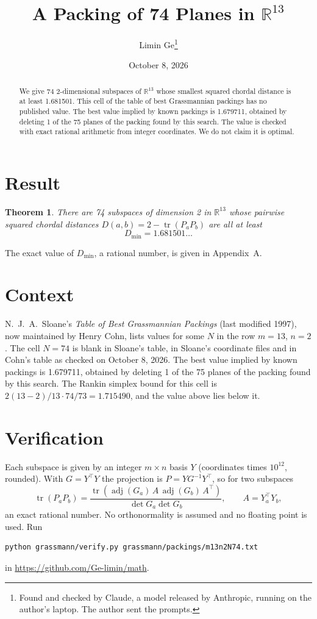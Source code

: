 \documentclass[11pt,a4paper]{article}
\title{A Packing of 74 Planes in $\mathbb{R}^{13}$}
\author{Limin Ge\thanks{Found and checked by Claude, a model released by Anthropic, running on the author's laptop. The author sent the prompts.}}
\date{October 8, 2026}
\newtheorem*{theorem}{Theorem}
\begin{document}
\maketitle
\begin{abstract}
We give 74 2-dimensional subspaces of $\mathbb{R}^{13}$ whose smallest squared chordal distance is at least 1.681501. This cell of the table of best Grassmannian packings has no published value. The best value implied by known packings is 1.679711, obtained by deleting 1 of the 75 planes of the packing found by this search. The value is checked with exact rational arithmetic from integer coordinates. We do not claim it is optimal.
\end{abstract}

\section{Result}
\begin{theorem}
There are 74 subspaces of dimension 2 in $\mathbb{R}^{13}$ whose pairwise squared chordal distances $D(a,b) = 2 - \operatorname{tr}(P_aP_b)$ are all at least
\[ D_{\min} = 1.681501\ldots \]
\end{theorem}
The exact value of $D_{\min}$, a rational number, is given in Appendix~A.


\section{Context}
N.~J.~A.~Sloane's \emph{Table of Best Grassmannian Packings} (last modified 1997), now maintained by Henry Cohn, lists values for some $N$ in the row $m=13$, $n=2$. The cell $N=74$ is blank in Sloane's table, in Sloane's coordinate files and in Cohn's table as checked on October 8, 2026. The best value implied by known packings is 1.679711, obtained by deleting 1 of the 75 planes of the packing found by this search. The Rankin simplex bound for this cell is $2(13-2)/13\cdot 74/73 = 1.715490$, and the value above lies below it.


\section{Verification}
Each subspace is given by an integer $m\times n$ basis $Y$ (coordinates times $10^{12}$, rounded). With $G=Y^\top Y$ the projection is $P=YG^{-1}Y^\top$, so for two subspaces
\[ \operatorname{tr}(P_aP_b)=\frac{\operatorname{tr}(\operatorname{adj}(G_a)\,A\,\operatorname{adj}(G_b)\,A^\top)}{\det G_a\det G_b},\qquad A=Y_a^\top Y_b, \]
an exact rational number. No orthonormality is assumed and no floating point is used. Run
\begin{verbatim}
python grassmann/verify.py grassmann/packings/m13n2N74.txt
\end{verbatim}
in \url{https://github.com/Ge-limin/math}.
\end{document}

